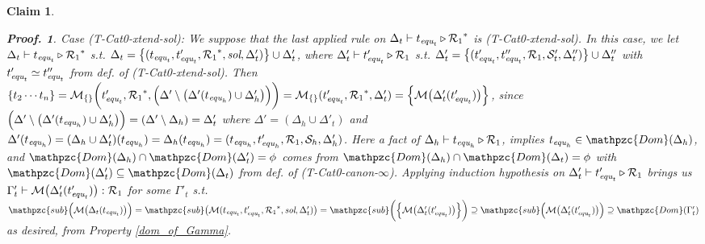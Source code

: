 \documentclass[12pt]{article}
\newtheorem{Claim}{Claim}[section]
\newtheorem{Proof}{Proof.}
\begin{document}
\begin{Claim}
\begin{Proof}
    Case (T-Cat0-xtend-sol): We suppose that the last applied rule on
    $\Delta_t \vdash t_{\text{\it equ}_t} \triangleright {\mathcal{R}_1}^*$
    is (T-Cat0-xtend-sol). In this case, we let
    $\Delta_t \vdash t_{\text{\it equ}_t} \triangleright {\mathcal{R}_1}^*$
    s.t. $\Delta_t = \bigl\{(t_{\text{\it equ}_t}, t'_{\text{\it equ}_t},
    {\mathcal{R}_1}^*, \text{\it sol}, \Delta'_t) \bigr\} \cup \Delta'_t$,
    where $\Delta'_t \vdash t'_{\text{\it equ}_t} \triangleright
    \mathcal{R}_1$ s.t. $\Delta'_t = \bigl\{(t'_{\text{\it equ}_t},
    t''_{\text{\it equ}_t}, \mathcal{R}_1, \mathcal{S}'_t, \Delta''_t)
    \bigr\} \cup \Delta''_t$ with
    $t'_{\text{\it equ}_t} \simeq t''_{\text{\it equ}_t}$ from def. of
    (T-Cat0-xtend-sol). Then
    $\{t_2 \cdots t_n\} = \mathcal{M}_{\{\}}\biggl(t'_{\text{\it equ}_t},
    {\mathcal{R}_1}^*, \Bigl(\Delta' \setminus \bigl(\Delta'(
    t_{\text{\it equ}_h}) \cup \Delta'_h \bigr) \Bigr) \biggr) =
    \mathcal{M}_{\{\}}(t'_{\text{\it equ}_t}, {\mathcal{R}_1}^*, \Delta'_t)
    = \Bigl\{\mathcal{M}\bigl(\Delta'_t(t'_{\text{\it equ}_t}) \bigr)
    \Bigr\}$, since
    $\Bigl(\Delta' \setminus \bigl(\Delta'(t_{\text{\it equ}_h})
    \cup \Delta'_h \bigr) \Bigr) = (\Delta' \setminus \Delta_h) =
    \Delta'_t$ where $\Delta' = (\Delta_h \cup \Delta'_t)$ and
    $\Delta'(t_{\text{\it equ}_h}) = (\Delta_h \cup \Delta'_t)(
    t_{\text{\it equ}_h}) = \Delta_h(t_{\text{\it equ}_h}) =
    (t_{\text{\it equ}_h}, t'_{\text{\it equ}_h}, \mathcal{R}_1,
    \mathcal{S}_h, \Delta'_h )$. Here a fact of
    $\Delta_h \vdash t_{\text{\it equ}_h} \triangleright \mathcal{R}_1$,
    implies $t_{\text{\it equ}_h} \in \mathpzc{Dom}(\Delta_h)$, and
    $\mathpzc{Dom}(\Delta_h) \cap \mathpzc{Dom}(\Delta'_t) = \phi$ comes
    from $\mathpzc{Dom}(\Delta_h) \cap \mathpzc{Dom}(\Delta_t) = \phi$ with
    $\mathpzc{Dom}(\Delta'_t) \subseteq \mathpzc{Dom}(\Delta_t)$ from def.
    of (T-Cat0-canon-$\infty$). Applying induction hypothesis on
    $\Delta'_t \vdash t'_{\text{\it equ}_t} \triangleright \mathcal{R}_1$
    brings us $\Gamma'_t \vdash \mathcal{M}\bigl(\Delta'_t(
    t'_{\text{\it equ}_t}) \bigr) : \mathcal{R}_1$ for some
    $\Gamma'_t$ s.t. $\mathpzc{sub}\Bigl(\mathcal{M}\bigl(\Delta_t(
    t_{\text{\it equ}_t}) \bigr) \Bigr) = \mathpzc{sub}\bigl(\mathcal{M}(
    t_{\text{\it equ}_t}, t'_{\text{\it equ}_t},  {\mathcal{R}_1}^*,
    \text{\it sol}, \Delta'_t ) \bigr) = \mathpzc{sub}\biggl(\Bigl\{
    \mathcal{M}\bigl(\Delta'_t(t'_{\text{\it equ}_t}) \bigr) \Bigr\}
    \biggr) \supseteq
    \mathpzc{sub}\Bigl(\mathcal{M}\bigl(\Delta'_t(t'_{\text{\it equ}_t})
    \bigr) \Bigr) \supseteq \mathpzc{Dom}(\Gamma'_t)$ as desired, from
    Property \ref{dom_of_Gamma}.
    

\end{Proof}
\end{Claim}
\end{document}
